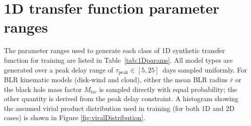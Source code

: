 \documentclass[floatfix,twocolumn,trackchanges,linenumbers]{aastex7}
\begin{document}
\section{1D transfer function parameter ranges}\label{sec:1Dparams}
The parameter ranges used to generate each class of 1D synthetic transfer function for training are listed in Table~\ref{tab:1Dparams}. All model types are generated over a peak delay range of $\tau_\text{peak}\in[5,25]$~days sampled uniformly. For BLR kinematic models (disk-wind and cloud), either the mean BLR radius $\bar{r}$ or the black hole mass factor $M_\text{fac}$ is sampled directly with equal probability; the other quantity is derived from the peak delay constraint. A histogram showing the assumed virial product distribution used in training (for both 1D and 2D cases) is shown in Figure \ref{fig:viralDistribution}.
\end{document}
